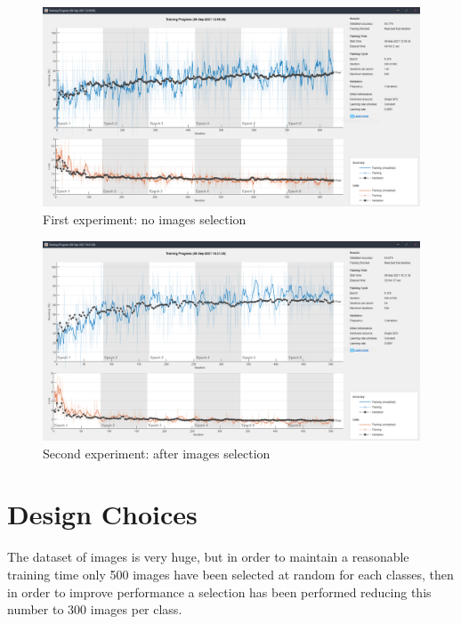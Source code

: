 \documentclass[a4paper]{report}
\begin{document}
	\begin{figure}[htbp]
		\centering
		\includegraphics[scale=0.31]{img/trainingCnnFourClasses.png}
		\caption{First experiment: no images selection}
		\label{img: trainingCnnFourClasses}
	\end{figure}
	
	\begin{figure}[htbp]
		\centering
		\includegraphics[scale=0.31]{img/trainingCnnFourClasses_afterSelection.png}
		\caption{Second experiment: after images selection}
		\label{img: trainingCnnFourClassesAfterSelection}
	\end{figure}
	

	
	\section{Design Choices}
	\noindent The dataset of images is very huge, but in order to maintain a reasonable training time only 500 images have been selected at random for each classes, then in order to improve performance a selection has been performed reducing this number to 300 images per class.
	
\end{document}

